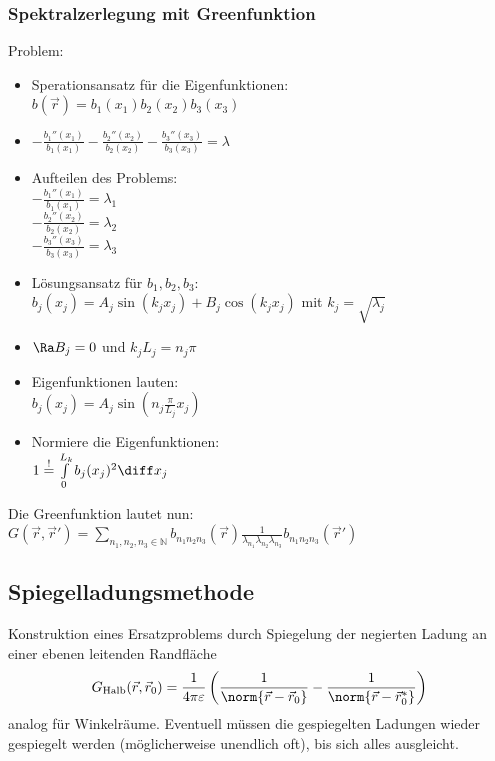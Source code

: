 \subsubsection{Spektralzerlegung mit Greenfunktion}
Problem: 

\begin{itemize}
      \item Sperationsansatz für die Eigenfunktionen: \\
            $b(\vec r) = b_1 (x_1) b_2(x_2) b_3(x_3)$
      \item $- \frac{b_1''(x_1)}{b_1 (x_1)} - \frac{b_2''(x_2)}{b_2 (x_2)}  - \frac{b_3''(x_3)}{b_3 (x_3)} = \lambda$
      \item Aufteilen des Problems: \\
            $- \frac{b_1''(x_1)}{b_1 (x_1)} = \lambda_1$ \\
            $- \frac{b_2''(x_2)}{b_2 (x_2)} = \lambda_2$ \\
            $- \frac{b_3''(x_3)}{b_3 (x_3)} = \lambda_3$
      \item Lösungsansatz für $b_1, b_2, b_3$: \\
            $b_j (x_j) = A_j \sin(k_j x_j) + B_j \cos (k_j x_j)$ mit $k_j = \sqrt{\lambda_j}$
      \item $\Ra B_j = 0$ und $k_j L_j = n_j \pi$
      \item Eigenfunktionen lauten: \\
            $b_j ( x_j ) = A_j \sin (n_j \frac{\pi}{L_j} x_j)$
      \item Normiere die Eigenfunktionen: \\
            $1 \overset{!}{=} \int \limits_0^{L_k} b_j (x_j)^2 \diff x_j$
\end{itemize}

Die Greenfunktion lautet nun: \\
$G(\vec r, \vec r') = \sum \limits_{n_1, n_2 , n_3 \in \mathbb N} b_{n_1 n_2 n_3} (\vec r ) \frac{1}{\lambda_{n_1}\lambda_{n_2}\lambda_{n_3}} b_{n_1 n_2 n_3} (\vec r' )$
\subsection*{Spiegelladungsmethode}
Konstruktion eines Ersatzproblems durch Spiegelung der negierten Ladung an einer ebenen leitenden Randfläche\\
\begin{align*}
      G_{\text{Halb}}(\vec r, \vec r_0) = \frac{1}{4 \pi \varepsilon} \left( \frac{1}{\norm{\vec r - \vec r_0}} - \frac{1}{\norm{\vec r - \vec r_0^*}}\right)
\end{align*}
analog für Winkelräume. Eventuell müssen die gespiegelten Ladungen wieder gespiegelt werden (möglicherweise unendlich oft), bis sich alles ausgleicht.

